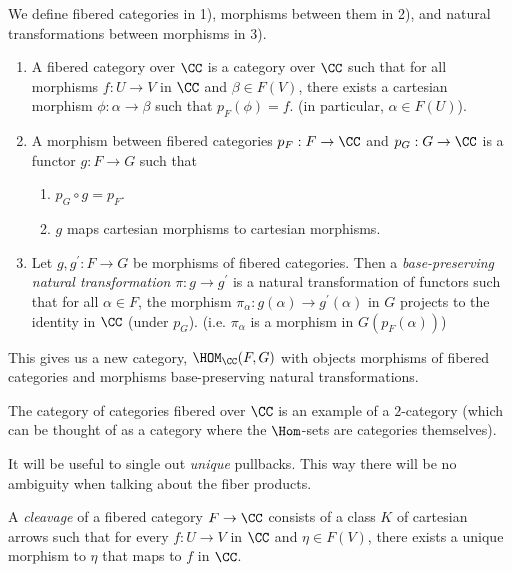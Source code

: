 \documentclass[11pt, english]{article}
\begin{document}
\begin{defi} We define fibered categories in 1), morphisms between them in 2), and natural transformations between morphisms in 3).
\label{def:fibered}
\begin{enumerate}
\item A fibered category over $\CC$ is a category over $\CC$ such that for all morphisms $f: U \to V$ in $\CC$ and $\beta \in F(V)$, there exists a cartesian morphism $\phi:\alpha \to \beta$ such that $p_F(\phi)=f$. (in particular, $\alpha \in F(U)$).

\item A morphism between fibered categories $p_F:F \to \CC$ and $p_G:G \to \CC$ is a functor $g:F \to G$ such that
\begin{enumerate}
\item $p_G \circ g = p_F$.
\item $g$ maps cartesian morphisms to cartesian morphisms.
\end{enumerate}
\item Let $g,g^\prime:F \to G$ be morphisms of fibered categories. Then a \emph{base-preserving natural transformation} $\pi:g \to g^\prime$ is a natural transformation of functors such that for all $\alpha \in F$, the morphism $\pi_\alpha:g(\alpha) \to g^\prime(\alpha)$ in $G$ projects to the identity in $\CC$ (under $p_G$). (i.e. $\pi_\alpha$ is a morphism in $G(p_F(\alpha))$)
\end{enumerate}
\end{defi}

This gives us a new category, $\HOM_\CC(F,G)$ with objects morphisms of fibered categories and morphisms base-preserving natural transformations.

\begin{remark}
The category of categories fibered over $\CC$ is an example of a $2$-category (which can be thought of as a category where the $\Hom$-sets are categories themselves).
\end{remark}

It will be useful to single out \emph{unique} pullbacks. This way there will be no ambiguity when talking about the fiber products.

\begin{defi}[Cleavage] A \emph{cleavage} of a fibered category $F \to \CC$ consists of a class $K$ of cartesian arrows such that for every $f:U \to V$ in $\CC$ and $\eta \in F(V)$, there exists a unique morphism to $\eta$ that maps to $f$ in $\CC$.
\end{defi}
\end{document}
